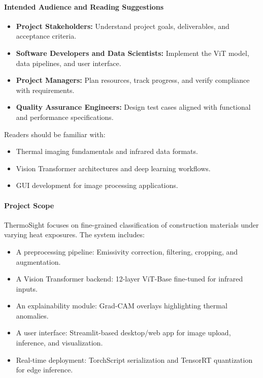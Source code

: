 \paragraph{Intended Audience and Reading Suggestions}
\begin{itemize}[leftmargin=*]
    \item \textbf{Project Stakeholders:} Understand project goals, deliverables, and acceptance criteria.
    \item \textbf{Software Developers and Data Scientists:} Implement the ViT model, data pipelines, and user interface.
    \item \textbf{Project Managers:} Plan resources, track progress, and verify compliance with requirements.
    \item \textbf{Quality Assurance Engineers:} Design test cases aligned with functional and performance specifications.
\end{itemize}
Readers should be familiar with:
\begin{itemize}[leftmargin=*]
    \item Thermal imaging fundamentals and infrared data formats.
    \item Vision Transformer architectures and deep learning workflows.
    \item GUI development for image processing applications.
\end{itemize}

\paragraph{Project Scope}
ThermoSight focuses on fine-grained classification of construction materials under varying heat exposures. The system includes:
\begin{itemize}[leftmargin=*]
    \item A preprocessing pipeline: Emissivity correction, filtering, cropping, and augmentation.
    \item A Vision Transformer backend: 12-layer ViT-Base fine-tuned for infrared inputs.
    \item An explainability module: Grad-CAM overlays highlighting thermal anomalies.
    \item A user interface: Streamlit-based desktop/web app for image upload, inference, and visualization.
    \item Real-time deployment: TorchScript serialization and TensorRT quantization for edge inference.
\end{itemize}

